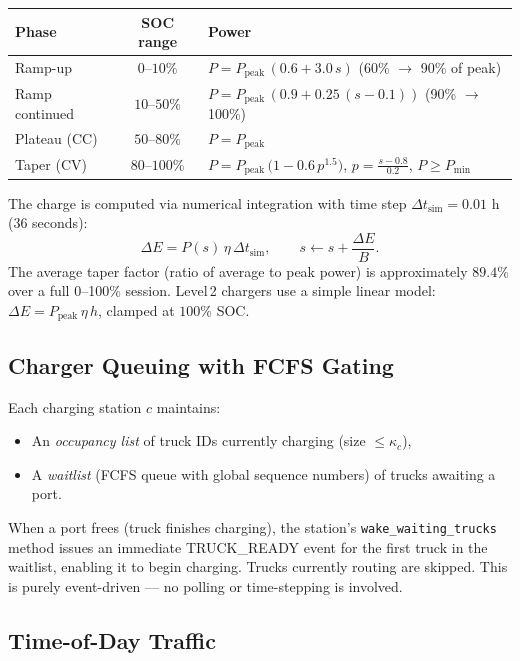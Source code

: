 \documentclass[11pt]{article}
\begin{document}
\begin{center}
\begin{tabular}{@{}lcl@{}}
\toprule
\textbf{Phase} & \textbf{SOC range} & \textbf{Power} \\
\midrule
Ramp-up & $0\text{--}10\%$ & $P = P_{\text{peak}}\,(0.6 + 3.0\,s)$ \quad (60\% $\to$ 90\% of peak) \\
Ramp continued & $10\text{--}50\%$ & $P = P_{\text{peak}}\,(0.9 + 0.25\,(s - 0.1))$ \quad (90\% $\to$ 100\%) \\
Plateau (CC) & $50\text{--}80\%$ & $P = P_{\text{peak}}$ \\
Taper (CV) & $80\text{--}100\%$ & $P = P_{\text{peak}}\,\big(1 - 0.6\,p^{1.5}\big)$, \; $p = \frac{s - 0.8}{0.2}$, \; $P \ge P_{\min}$ \\
\bottomrule
\end{tabular}
\end{center}

The charge is computed via numerical integration with time step $\Delta t_{\text{sim}} = 0.01$ h (36 seconds):
\[
\Delta E = P(s)\,\eta\,\Delta t_{\text{sim}}, \qquad s \leftarrow s + \frac{\Delta E}{B}.
\]
The average taper factor (ratio of average to peak power) is approximately $89.4\%$ over a full 0--100\% session. Level\,2 chargers use a simple linear model: $\Delta E = P_{\text{peak}}\,\eta\,h$, clamped at $100\%$ SOC.

\subsection{Charger Queuing with FCFS Gating}

Each charging station $c$ maintains:
\begin{itemize}[nosep]
    \item An \emph{occupancy list} of truck IDs currently charging (size $\le \kappa_c$),
    \item A \emph{waitlist} (FCFS queue with global sequence numbers) of trucks awaiting a port.
\end{itemize}
When a port frees (truck finishes charging), the station's \texttt{wake\_waiting\_trucks} method issues an immediate \textsc{TRUCK\_READY} event for the first truck in the waitlist, enabling it to begin charging. Trucks currently routing are skipped. This is purely event-driven --- no polling or time-stepping is involved.

\subsection{Time-of-Day Traffic}
\end{document}
